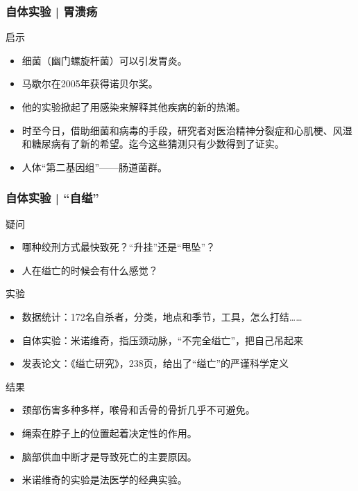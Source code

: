 \begin{frame}
  \frametitle{自体实验 | 胃溃疡}
  \begin{block}{启示}
    \begin{itemize}
      \item 细菌（幽门螺旋杆菌）可以引发胃炎。
      \item 马歇尔在2005年获得诺贝尔奖。
      \item 他的实验掀起了用感染来解释其他疾病的新的热潮。
      \item 时至今日，借助细菌和病毒的手段，研究者对医治精神分裂症和心肌梗、风湿和糖尿病有了新的希望。迄今这些猜测只有少数得到了证实。
      \item \alert{人体“第二基因组”——肠道菌群}。
    \end{itemize}
  \end{block}
\end{frame}

\begin{frame}
  \frametitle{自体实验 | “自缢”}
  \begin{block}{疑问}
    \begin{itemize}
      \item 哪种绞刑方式最快致死？“升挂”还是“甩坠”？
      \item 人在缢亡的时候会有什么感觉？
    \end{itemize}
  \end{block}
  \vspace{-0.3em}
  \pause
  \begin{block}{实验}
    \begin{itemize}
      \item 数据统计：172名自杀者，分类，地点和季节，工具，怎么打结……
      \item 自体实验：米诺维奇，指压颈动脉，“不完全缢亡”，把自己吊起来
      \item 发表论文：《缢亡研究》，238页，给出了“缢亡”的严谨科学定义
    \end{itemize}
  \end{block}
  \vspace{-0.3em}
  \pause
  \begin{block}{结果}
    \begin{itemize}
      \item 颈部伤害多种多样，喉骨和舌骨的骨折几乎不可避免。
      \item 绳索在脖子上的位置起着决定性的作用。
      \item 脑部供血中断才是导致死亡的主要原因。
      \item 米诺维奇的实验是法医学的经典实验。
    \end{itemize}
  \end{block}
\end{frame}

